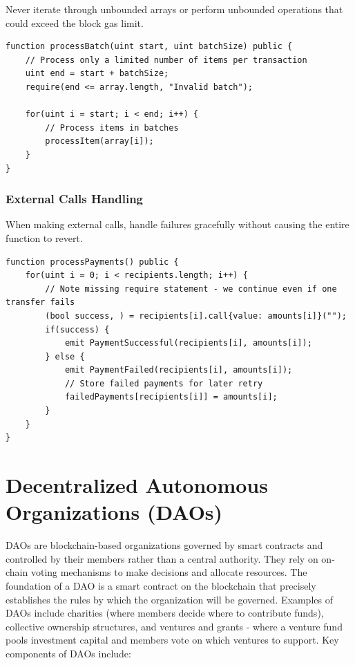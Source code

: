 \documentclass[12pt]{article}
\begin{document}
Never iterate through unbounded arrays or perform unbounded operations that
could exceed the block gas limit.

\noindent
\begin{minipage}{\textwidth}
    \begin{lstlisting}[language=Solidity, caption=Bounded Operations Example]
function processBatch(uint start, uint batchSize) public {
    // Process only a limited number of items per transaction
    uint end = start + batchSize;
    require(end <= array.length, "Invalid batch");
    
    for(uint i = start; i < end; i++) {
        // Process items in batches
        processItem(array[i]);
    }
}
\end{lstlisting}
\end{minipage}

\subsubsection*{External Calls Handling}

When making external calls, handle failures gracefully without causing the
entire function to revert.

\noindent
\begin{minipage}{\textwidth}
    \begin{lstlisting}[language=Solidity, caption=Safe External Call Example]
function processPayments() public {
    for(uint i = 0; i < recipients.length; i++) {
        // Note missing require statement - we continue even if one transfer fails
        (bool success, ) = recipients[i].call{value: amounts[i]}("");
        if(success) {
            emit PaymentSuccessful(recipients[i], amounts[i]);
        } else {
            emit PaymentFailed(recipients[i], amounts[i]);
            // Store failed payments for later retry
            failedPayments[recipients[i]] = amounts[i];
        }
    }
}
\end{lstlisting}
\end{minipage}

\section{Decentralized Autonomous Organizations (DAOs)}

DAOs are blockchain-based organizations governed by smart contracts and
controlled by their members rather than a central authority. They rely on
on-chain voting mechanisms to make decisions and allocate resources. The
foundation of a DAO is a smart contract on the blockchain that precisely
establishes the rules by which the organization will be governed. Examples of
DAOs include charities (where members decide where to contribute funds),
collective ownership structures, and ventures and grants - where a venture fund
pools investment capital and members vote on which ventures to support. Key
components of DAOs include:
\end{document}

